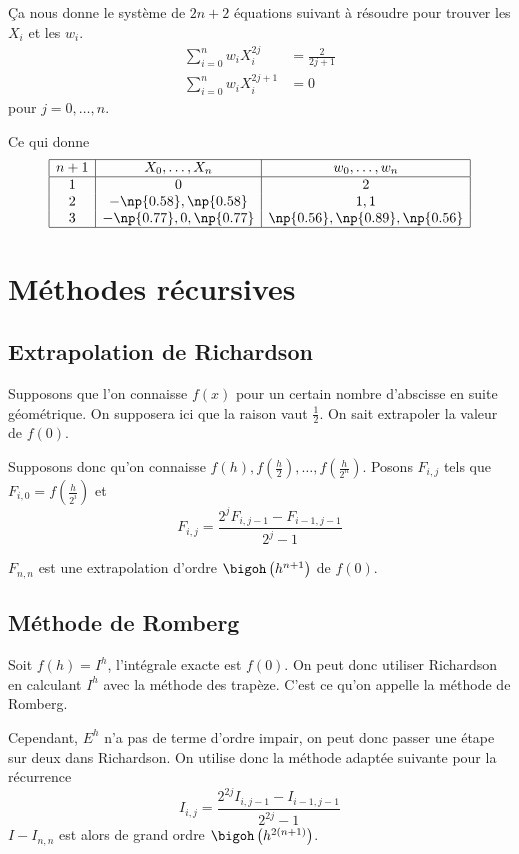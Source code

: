 Ça nous donne le système de $2n+2$ équations suivant à résoudre
pour trouver les $X_i$ et les $w_i$.
\begin{align*}
  \sum_{i=0}^n w_i X_i^{2j} & = \frac{2}{2j+1}\\
  \sum_{i=0}^n w_i X_i^{2j+1} & = 0
\end{align*}
pour $j = 0, \ldots, n$.

Ce qui donne
\[
  \begin{array}{|c|c|c|}
    \hline
    n+1 & X_0, \ldots, X_n & w_0, \ldots, w_n\\
    \hline
    1 & 0 & 2\\
    2 & -\np{0.58}, \np{0.58} & 1, 1\\
    3 & -\np{0.77}, 0, \np{0.77} & \np{0.56}, \np{0.89}, \np{0.56}\\
    \hline
  \end{array}
\]

\section{Méthodes récursives}
\subsection{Extrapolation de Richardson}
Supposons que l'on connaisse $f(x)$ pour un certain nombre d'abscisse en
suite géométrique. On supposera ici que la raison vaut $\frac{1}{2}$.
On sait extrapoler la valeur de $f(0)$.

Supposons donc qu'on connaisse
$f(h), f\left(\frac{h}{2}\right), \ldots, f\left(\frac{h}{2^n}\right)$.
Posons
$F_{i, j}$ tels que $F_{i, 0} = f\left(\frac{h}{2^i}\right)$ et
\[ F_{i, j} = \frac{2^j F_{i, j-1} - F_{i-1, j-1}}{2^j - 1} \]

$F_{n, n}$ est une extrapolation d'ordre
$\bigoh\left(h^{n+1}\right)$ de $f(0)$.

\subsection{Méthode de Romberg}
Soit $f(h) = I^h$, l'intégrale exacte est $f(0)$.
On peut donc utiliser Richardson en calculant
$I^h$ avec la méthode des trapèze.
C'est ce qu'on appelle la méthode de Romberg.

Cependant, $E^h$ n'a pas de terme d'ordre impair, on peut donc passer
une étape sur deux dans Richardson.
On utilise donc la méthode adaptée suivante pour la récurrence
\[ I_{i, j} = \frac{2^{2j} I_{i, j-1} - I_{i-1, j-1}}{2^{2j} - 1} \]
$I - I_{n, n}$ est alors de grand ordre $\bigoh\left(h^{2(n+1)}\right)$.

